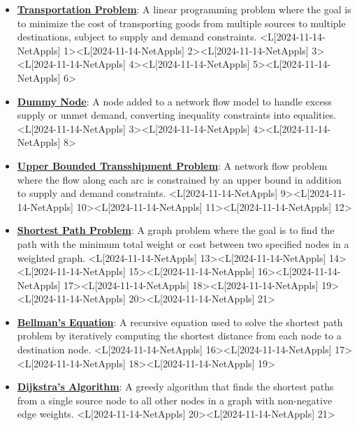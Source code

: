 \documentclass{article}%
\begin{document}
\begin{itemize}[[leftmargin=*]]%
\item \href{https://www.math.purdue.edu/~yipn/421/2024-11-14-NetAppls.pdf#page=1}{\textbf{Transportation Problem}}: A linear programming problem where the goal is to minimize the cost of transporting goods from multiple sources to multiple destinations, subject to supply and demand constraints. <L[2024-11-14-NetAppls] 1><L[2024-11-14-NetAppls] 2><L[2024-11-14-NetAppls] 3><L[2024-11-14-NetAppls] 4><L[2024-11-14-NetAppls] 5><L[2024-11-14-NetAppls] 6>%
\item \href{https://www.math.purdue.edu/~yipn/421/2024-11-14-NetAppls.pdf#page=3}{\textbf{Dummy Node}}: A node added to a network flow model to handle excess supply or unmet demand, converting inequality constraints into equalities. <L[2024-11-14-NetAppls] 3><L[2024-11-14-NetAppls] 4><L[2024-11-14-NetAppls] 8>%
\item \href{https://www.math.purdue.edu/~yipn/421/2024-11-14-NetAppls.pdf#page=9}{\textbf{Upper Bounded Transshipment Problem}}: A network flow problem where the flow along each arc is constrained by an upper bound in addition to supply and demand constraints. <L[2024-11-14-NetAppls] 9><L[2024-11-14-NetAppls] 10><L[2024-11-14-NetAppls] 11><L[2024-11-14-NetAppls] 12>%
\item \href{https://www.math.purdue.edu/~yipn/421/2024-11-14-NetAppls.pdf#page=13}{\textbf{Shortest Path Problem}}: A graph problem where the goal is to find the path with the minimum total weight or cost between two specified nodes in a weighted graph. <L[2024-11-14-NetAppls] 13><L[2024-11-14-NetAppls] 14><L[2024-11-14-NetAppls] 15><L[2024-11-14-NetAppls] 16><L[2024-11-14-NetAppls] 17><L[2024-11-14-NetAppls] 18><L[2024-11-14-NetAppls] 19><L[2024-11-14-NetAppls] 20><L[2024-11-14-NetAppls] 21>%
\item \href{https://www.math.purdue.edu/~yipn/421/2024-11-14-NetAppls.pdf#page=16}{\textbf{Bellman's Equation}}: A recursive equation used to solve the shortest path problem by iteratively computing the shortest distance from each node to a destination node. <L[2024-11-14-NetAppls] 16><L[2024-11-14-NetAppls] 17><L[2024-11-14-NetAppls] 18><L[2024-11-14-NetAppls] 19>%
\item \href{https://www.math.purdue.edu/~yipn/421/2024-11-14-NetAppls.pdf#page=20}{\textbf{Dijkstra's Algorithm}}: A greedy algorithm that finds the shortest paths from a single source node to all other nodes in a graph with non-negative edge weights. <L[2024-11-14-NetAppls] 20><L[2024-11-14-NetAppls] 21>%
\end{itemize}%
\end{document}
